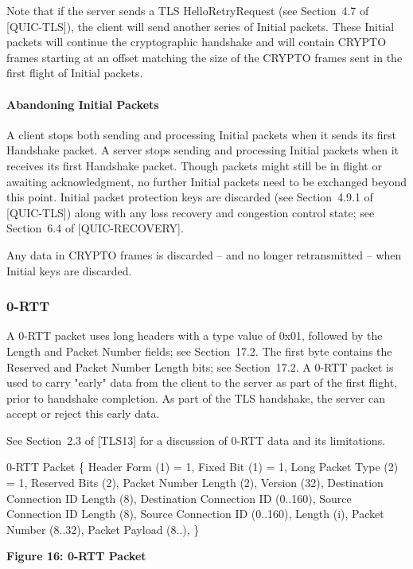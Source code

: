 \documentclass{article}
\begin{document}
Note that if the server sends a TLS HelloRetryRequest (see Section~4.7 of [QUIC-TLS]), the client will send another series of Initial packets.  These Initial packets will continue the cryptographic handshake and will contain CRYPTO frames starting at an offset matching the size of the CRYPTO frames sent in the first flight of Initial packets.

\paragraph{Abandoning Initial Packets}

A client stops both sending and processing Initial packets when it sends its first Handshake packet.  A server stops sending and processing Initial packets when it receives its first Handshake packet.  Though packets might still be in flight or awaiting acknowledgment, no further Initial packets need to be exchanged beyond this point.  Initial packet protection keys are discarded (see Section~4.9.1 of [QUIC-TLS]) along with any loss recovery and congestion control state; see Section~6.4 of [QUIC-RECOVERY].

Any data in CRYPTO frames is discarded -- and no longer retransmitted -- when Initial keys are discarded.

\subsubsection{0-RTT}

A 0-RTT packet uses long headers with a type value of 0x01, followed by the Length and Packet Number fields; see Section~17.2.  The first byte contains the Reserved and Packet Number Length bits; see Section~17.2.  A 0-RTT packet is used to carry "early" data from the client to the server as part of the first flight, prior to handshake completion.  As part of the TLS handshake, the server can accept or reject this early data.

See Section~2.3 of [TLS13] for a discussion of 0-RTT data and its limitations.

0-RTT Packet \{ Header Form (1) = 1, Fixed Bit (1) = 1, Long Packet Type (2) = 1, Reserved Bits (2), Packet Number Length (2), Version (32), Destination Connection ID Length (8), Destination Connection ID (0..160), Source Connection ID Length (8), Source Connection ID (0..160), Length (i), Packet Number (8..32), Packet Payload (8..), \}

\begin{center}
\textbf{Figure 16: 0-RTT Packet}
\end{center}
\end{document}

